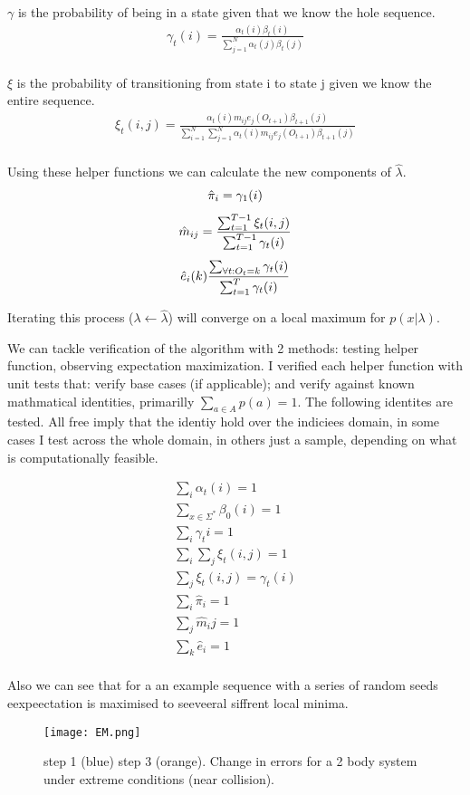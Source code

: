 $\gamma$ is the probability of being in a state given that we know the hole sequence.
\begin{gather}
    \gamma_t(i) = \frac{\alpha_t(i) \beta_t(i)}{\sum_{j=1}^N \alpha_t(j) \beta_t(j)}\\
\end{gather}

$\xi$ is the probability of transitioning from state i to state j given we know the entire sequence.
\begin{gather}
    \xi_t(i, j) = \frac{\alpha_t(i) m_{ij} e_j(O_{t+1}) \beta_{t+1}(j)}{\sum_{i=1}^N \sum_{j=1}^N \alpha_t(i) m_{ij} e_j(O_{t+1}) \beta_{t+1}(j)} \\ 
\end{gather}

Using these helper functions we can calculate the new components of $\hat{\lambda}$.
\begin{gather}
    \hat{\pi}_i = \gamma_1(i)\biggbreak
    \hat{m}_{ij} = \frac{\sum_{t=1}^{T-1} \xi_t(i,j)}{\sum_{t=1}^{T-1} \gamma_t(i)}\biggbreak
    \hat{e}_i(k) \frac{\sum_{\forall t: O_t = k} \gamma_t(i)}{\sum_{t=1}^T \gamma_t(i)}
\end{gather}

Iterating this process ($\lambda \gets \hat{\lambda}$) will converge on a local maximum for $p(x|\lambda)$.

We can tackle verification of the algorithm with 2 methods: testing helper function, observing expectation maximization. I verified each helper function with unit tests that: verify base cases (if applicable); and verify against known mathmatical identities, primarilly $\sum_{a \in A} p(a) = 1$. The following identites are tested. All free imply that the identiy hold over the indiciees domain, in some cases I test across the whole domain, in others just a sample, depending on what is computationally feasible.

\begin{gather}
    \sum_i \alpha_t(i) = 1 \\
    \sum_{x \in \Sigma^*} \beta_0(i) = 1\\
    \sum_{i} \gamma_t{i} = 1\\
    \sum_{i}\sum_{j} \xi_t(i, j)=1\\
    \sum_{j} \xi_t(i,j) = \gamma_t(i)\\
    \sum_i \hat{\pi}_i = 1\\
    \sum_j \hat{m}_ij = 1\\
    \sum_k \hat{e}_i = 1 \\
\end{gather}

Also we can see that for a an example sequence with a series of random seeds eexpeectation is maximised to seeveeral siffrent local minima. \cite{em}
\begin{figure}[h!]
    \begin{center}
    \texttt{[image: EM.png]}
      \caption{step 1 (blue) step 3 (orange). Change in errors for a 2 body system under extreme conditions (near collision).}
      \label{fig:convergence}
    \end{center}
    \end{figure}
